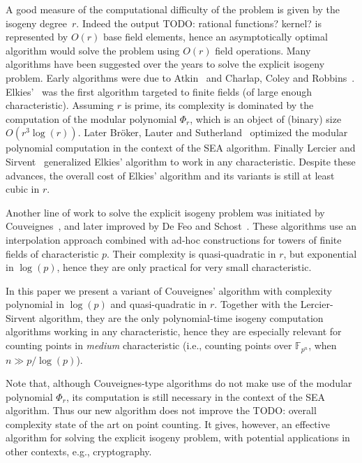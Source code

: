 \documentclass{lms}
\newcommand{\todo}[1]{{\color{red}TODO: #1}}
\newcommand{\F}{\mathbb{F}}
\begin{document}
A good measure of the computational difficulty of the problem is given
by the isogeny degree~$r$. Indeed the output \todo{rational functions? kernel?} is represented by
$O(r)$ base field elements, hence an asymptotically optimal algorithm
would solve the problem using $O(r)$ field operations. Many algorithms
have been suggested over the years to solve the explicit isogeny
problem. Early algorithms were due to Atkin~\cite{atkin91} and
Charlap, Coley and
Robbins~\cite{charlap1991enumeration}. Elkies'~\cite{elkies92,elkies98,Bostan}
was the first algorithm targeted to finite fields (of large enough
characteristic). Assuming $r$ is prime, its complexity is dominated by
the computation of the modular polynomial $\Phi_r$, which is an object
of (binary) size $O(r^3\log(r))$. Later Bröker, Lauter and
Sutherland~\cite{sutherland10:modpol} optimized the modular polynomial
computation in the context of the SEA
algorithm. Finally Lercier and Sirvent~\cite{lercier+sirvent08,1602.00244}
generalized Elkies' algorithm to work in any characteristic. Despite
these advances, the overall cost of Elkies' algorithm and its
variants is still at least cubic in $r$.

Another line of work to solve the explicit isogeny problem was
initiated by Couveignes~\cite{couveignes94,couveignes96,couveignes00},
and later improved by De Feo and Schost~\cite{df10,df+schost12}. These
algorithms use an interpolation approach combined with ad-hoc
constructions for towers of finite fields of characteristic $p$. Their
complexity is quasi-quadratic in $r$, but exponential in $\log(p)$,
hence they are only practical for very small characteristic.

In this paper we present a variant of Couveignes' algorithm with
complexity polynomial in $\log(p)$ and quasi-quadratic in $r$. Together
with the Lercier-Sirvent algorithm, they are the only polynomial-time
isogeny computation algorithms working in any characteristic, hence
they are especially relevant for counting points in \emph{medium}
characteristic (i.e., counting points over $\F_{p^n}$, when
$n\gg p/\log (p)$).

Note that, although Couveignes-type algorithms do not make use of the
modular polynomial $\Phi_r$, its computation is still necessary in the
context of the SEA algorithm. Thus our new algorithm does not improve
the \todo{overall complexity} state of the art on point counting. It
gives, however, an effective algorithm for solving the explicit
isogeny problem, with potential applications in other contexts, e.g.,
cryptography.
\end{document}
